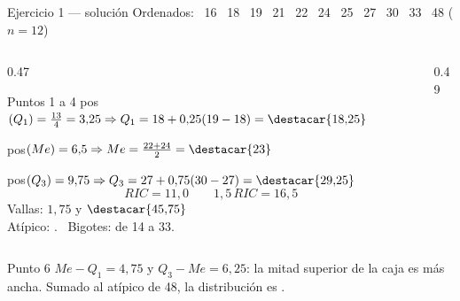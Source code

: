 \documentclass[aspectratio=169,10pt]{beamer}
\newcommand{\cajahor}[8]{%
  \draw[#8,thick] (#2*#1,#7) -- (#3*#1,#7);
  \draw[#8,thick] (#5*#1,#7) -- (#6*#1,#7);
  \draw[#8,thick] (#2*#1,#7-0.16) -- (#2*#1,#7+0.16);
  \draw[#8,thick] (#6*#1,#7-0.16) -- (#6*#1,#7+0.16);
  \draw[#8,thick,fill=#8!18] (#3*#1,#7-0.28) rectangle (#5*#1,#7+0.28);
  \draw[#8,very thick] (#4*#1,#7-0.28) -- (#4*#1,#7+0.28);
}
\begin{document}
\begin{frame}{Ejercicio 1 — solución}
  \scriptsize
  Ordenados:  \ 16 \ 18 \ 19 \ 21 \ 22 \ 24 \ 25 \ 27 \ 30 \ 33
  \ 48 \rmfamily \quad ($n = 12$)

  \vspace{0.1cm}
  \begin{columns}[T,onlytextwidth]
    \begin{column}{0.47\textwidth}
      \begin{exampleblock}{Puntos 1 a 4}
        \scriptsize
        pos$(Q_1) = \frac{13}{4} = 3{,}25 \Rightarrow
        Q_1 = 18+0{,}25(19-18) = \destacar{18{,}25}$

        pos$(Me) = 6{,}5 \Rightarrow Me = \frac{22+24}{2} = \destacar{23}$

        pos$(Q_3) = 9{,}75 \Rightarrow Q_3 = 27+0{,}75(30-27) = \destacar{29{,}25}$
        \[ RIC = 11{,}0 \qquad 1{,}5\,RIC = 16{,}5 \]
        Vallas: $1{,}75$ y $\destacar{45{,}75}$ \\
        Atípico: . \ Bigotes: de 14 a 33.
      \end{exampleblock}
    \end{column}
    \begin{column}{0.49\textwidth}
      \centering
    \end{column}
  \end{columns}

  \vspace{0.1cm}
  \begin{alertblock}{Punto 6}
    \tiny
    $Me-Q_1 = 4{,}75$ y $Q_3-Me = 6{,}25$: la mitad superior de la caja es más
    ancha. Sumado al atípico de 48, la distribución es
    .
  \end{alertblock}
\end{frame}
\end{document}
